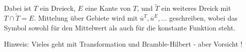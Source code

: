 \documentclass[11pt,a4paper]{report}
\begin{document}
\begin{enumerate}
\begin{itemize}
    \end{itemize}
  Dabei ist $T$ ein Dreieck, $E$ eine Kante von $T$, und $\tilde T$
  ein weiteres Dreick mit $T \cap \tilde T = E$. Mittelung \"uber
  Gebiete wird mit $\overline{u}^T, \overline{u}^E, \ldots $
  geschreiben, wobei das Symbol sowohl f\"ur den Mittelwert als auch
  f\"ur die konstante Funktion steht.

  Hinweis: Vieles geht mit Transformation und Bramble-Hilbert - aber
  Vorsicht !
\end{enumerate}
\end{document}
